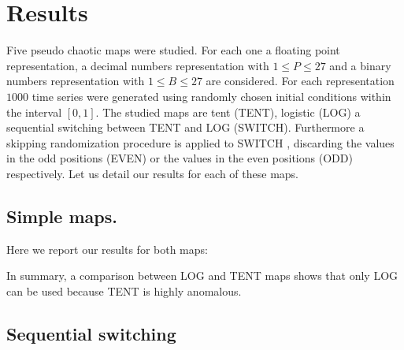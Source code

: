 \section{Results}\label{sec:resultados}
Five pseudo chaotic maps were studied. For each one a floating point representation, a decimal numbers representation with $1\leq P \leq 27$ and a binary numbers representation with $1\leq B \leq 27$ are considered. For each representation $1000$ time series were generated using randomly chosen initial conditions within the interval $[0,1]$. 
The studied maps are tent (TENT), logistic (LOG) a sequential switching between TENT and LOG (SWITCH). Furthermore a skipping randomization procedure is applied to SWITCH \cite{DeMicco2008}, discarding the values in the odd positions (EVEN) or the values in the even positions (ODD) respectively. Let us detail our results for each of these maps.

\subsection {Simple maps.}\label{subsec:SimpleMaps}
Here we report our results for both maps:





In summary, a comparison between LOG and TENT maps shows that only LOG  can be used because TENT is highly anomalous. 

\subsection{Sequential switching}\label{subsec:SecSwitch}





